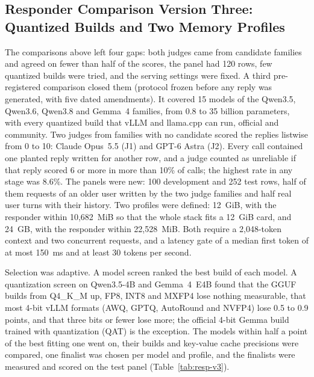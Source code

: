 \subsection{Responder Comparison Version Three: Quantized Builds and Two Memory Profiles}
\label{sec:res-resp-v3}

The comparisons above left four gaps: both judges came from candidate families and agreed
on fewer than half of the scores, the panel had 120 rows, few quantized builds were tried,
and the serving settings were fixed. A third pre-registered comparison closed them (protocol
frozen before any reply was generated, with five dated amendments). It covered 15 models of
the Qwen3.5, Qwen3.6, Qwen3.8 and Gemma~4 families, from 0.8 to 35 billion parameters, with
every quantized build that vLLM and llama.cpp can run, official and community. Two judges
from families with no candidate scored the replies listwise from 0 to 10: Claude Opus~5.5
(J1) and GPT-6 Astra (J2). Every call contained one planted reply written for another row,
and a judge counted as unreliable if that reply scored 6 or more in more than 10\% of calls;
the highest rate in any stage was 8.6\%. The panels were new: 100 development and 252 test
rows, half of them requests of an older user written by the two judge families and half real
user turns with their history. Two profiles were defined: 12~GiB, with the responder within
10,682~MiB so that the whole stack fits a 12~GiB card, and 24~GB, with the responder within
22,528~MiB. Both require a 2,048-token context and two concurrent requests, and a latency
gate of a median first token of at most 150~ms and at least 30 tokens per second.

Selection was adaptive. A model screen ranked the best build of each model. A quantization
screen on Qwen3.5-4B and Gemma~4~E4B found that the GGUF builds from Q4\_K\_M up, FP8, INT8
and MXFP4 lose nothing measurable, that most 4-bit vLLM formats (AWQ, GPTQ, AutoRound and
NVFP4) lose 0.5 to 0.9 points, and that three bits or fewer lose more; the official 4-bit
Gemma build trained with quantization (QAT) is the exception. The models within half a point
of the best fitting one went on, their builds and key-value cache precisions were compared,
one finalist was chosen per model and profile, and the finalists were measured and scored on
the test panel (Table~\ref{tab:resp-v3}).

